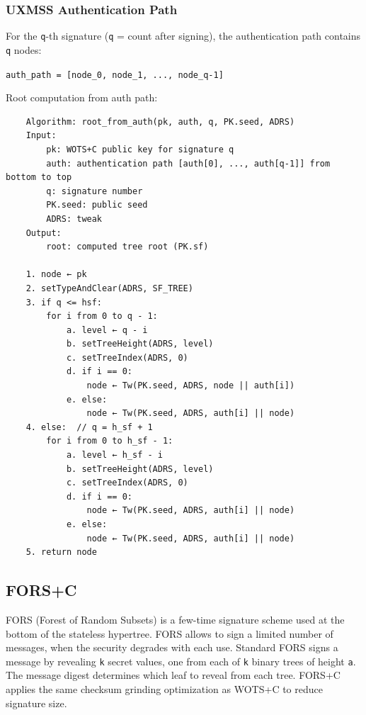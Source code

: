 \subsubsection{UXMSS Authentication Path}
For the \texttt{q}-th signature (\texttt{q} = count after signing), the authentication path contains \texttt{q} nodes:
\begin{center}
    \texttt{auth\_path = [node\_0, node\_1, ..., node\_{q-1}]}
\end{center}

Root computation from auth path:

\begin{verbatim}
    Algorithm: root_from_auth(pk, auth, q, PK.seed, ADRS)
    Input:
        pk: WOTS+C public key for signature q
        auth: authentication path [auth[0], ..., auth[q-1]] from bottom to top
        q: signature number 
        PK.seed: public seed
        ADRS: tweak
    Output:
        root: computed tree root (PK.sf)

    1. node ← pk
    2. setTypeAndClear(ADRS, SF_TREE)
    3. if q <= hsf:
        for i from 0 to q - 1:
            a. level ← q - i
            b. setTreeHeight(ADRS, level)
            c. setTreeIndex(ADRS, 0)
            d. if i == 0:
                node ← Tw(PK.seed, ADRS, node || auth[i])
            e. else:
                node ← Tw(PK.seed, ADRS, auth[i] || node)
    4. else:  // q = h_sf + 1
        for i from 0 to h_sf - 1:
            a. level ← h_sf - i
            b. setTreeHeight(ADRS, level)
            c. setTreeIndex(ADRS, 0)
            d. if i == 0:
                node ← Tw(PK.seed, ADRS, auth[i] || node)
            e. else:
                node ← Tw(PK.seed, ADRS, auth[i] || node)
    5. return node
\end{verbatim}

\subsection{FORS+C}
FORS (Forest of Random Subsets) is a few-time signature scheme used at the bottom of the stateless hypertree. FORS allows to sign a limited number of messages, when the security degrades with each use. Standard FORS signs a message by revealing \texttt{k} secret values, one from each of \texttt{k} binary trees of height \texttt{a}. The message digest determines which leaf to reveal from each tree. FORS+C applies the same checksum grinding optimization as WOTS+C to reduce signature size.

